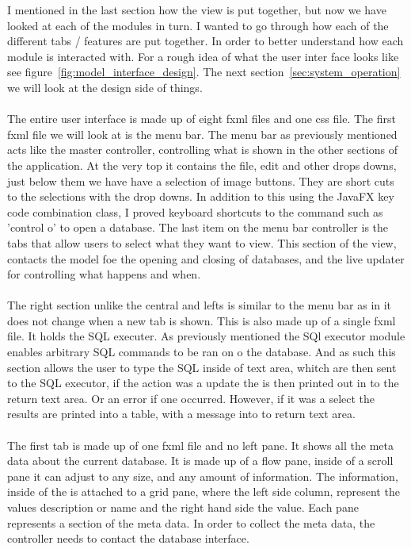 I mentioned in the last section how the view is put together, but now we have looked at each of the modules in turn. I wanted to go through how each of the different tabs / features are put together. In order to better understand how each module is interacted with. For a rough idea of what the user inter face looks like see figure~\ref{fig:model_interface_design}. The next section~\ref{sec:system_operation} we will look at the design side of things. 
\\\\
The entire user interface is made up of eight fxml files and one css file.  The first fxml file we will look at is the menu bar. The menu bar as previously mentioned acts like the master controller, controlling what is shown in the other sections of the application. At the very top it contains the file, edit and other drops downs, just below them we have have a selection of image buttons. They are short cuts to the selections with the drop downs. In addition to this using the JavaFX key code combination class, I proved keyboard shortcuts to the command such as 'control o' to open a database. The last item on the menu bar controller is the tabs that allow users to select what they want to view. This section of the view, contacts the model foe the opening and closing of databases, and the live updater for controlling what happens and when.  
\\\\
The right section unlike the central and lefts is similar to the menu bar as in it does not change when a new tab is shown. This is also made up of a single fxml file. It holds the SQL executer. As previously mentioned the SQl executor module enables arbitrary SQL commands to be ran on o the database. And as such this section allows the user to type the SQL inside of text area, whitch are then sent to the SQL executor, if the action was a update the is then printed out in to the return text area. Or an error if one occurred. However, if it was a select the results are printed into a table, with a message into to return text area.
\\\\
The first tab is made up of one fxml file and no left pane. It shows all the meta data about the current database. It is made up of a flow pane, inside of a scroll pane it can adjust to any size, and any amount of information. The information, inside of the is attached to a grid pane, where the left side column, represent the values description or name and the right hand side the value. Each pane represents a section of the meta data. In order to collect the meta data, the controller needs to contact the database interface.
